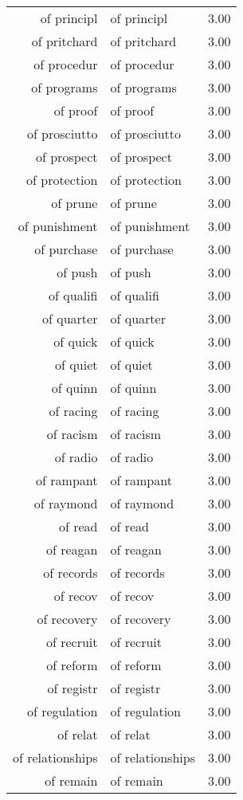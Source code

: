 \begin{table}[ht]
\begin{tabular}{rlr}
  of principl & of principl & 3.00 \\ 
  of pritchard & of pritchard & 3.00 \\ 
  of procedur & of procedur & 3.00 \\ 
  of programs & of programs & 3.00 \\ 
  of proof & of proof & 3.00 \\ 
  of prosciutto & of prosciutto & 3.00 \\ 
  of prospect & of prospect & 3.00 \\ 
  of protection & of protection & 3.00 \\ 
  of prune & of prune & 3.00 \\ 
  of punishment & of punishment & 3.00 \\ 
  of purchase & of purchase & 3.00 \\ 
  of push & of push & 3.00 \\ 
  of qualifi & of qualifi & 3.00 \\ 
  of quarter & of quarter & 3.00 \\ 
  of quick & of quick & 3.00 \\ 
  of quiet & of quiet & 3.00 \\ 
  of quinn & of quinn & 3.00 \\ 
  of racing & of racing & 3.00 \\ 
  of racism & of racism & 3.00 \\ 
  of radio & of radio & 3.00 \\ 
  of rampant & of rampant & 3.00 \\ 
  of raymond & of raymond & 3.00 \\ 
  of read & of read & 3.00 \\ 
  of reagan & of reagan & 3.00 \\ 
  of records & of records & 3.00 \\ 
  of recov & of recov & 3.00 \\ 
  of recovery & of recovery & 3.00 \\ 
  of recruit & of recruit & 3.00 \\ 
  of reform & of reform & 3.00 \\ 
  of registr & of registr & 3.00 \\ 
  of regulation & of regulation & 3.00 \\ 
  of relat & of relat & 3.00 \\ 
  of relationships & of relationships & 3.00 \\ 
  of remain & of remain & 3.00 \\ 

\end{tabular}
\end{table}

